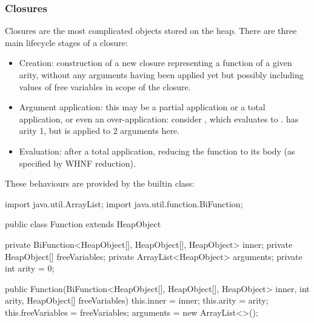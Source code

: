 \documentclass[dissertation.tex]{subfiles}
\begin{document}
{{{        }
        \subsubsection{Closures}\label{sec:closures}
        {

            Closures are the most complicated objects stored on the heap. There are three main lifecycle stages of a
            closure:

            \begin{itemize}
            \item
            {
                Creation: construction of a new closure representing a function of a given arity, without any
                arguments having been applied yet but possibly including values of free variables in scope of the
                closure.
            }
            \item
            {
                
                Argument application: this may be a partial application or a total application, or even an
                over-application: consider , which evaluates to .  has
                arity 1, but is applied to 2 arguments here.

            }
            \item
            {
                Evaluation: after a total application, reducing the function to its body (as specified by WHNF
                reduction).
            }
            \end{itemize}

            These behaviours are provided by the  builtin class:

            \begin{javafigure}
            import java.util.ArrayList;
            import java.util.function.BiFunction;
                            
            public class Function extends HeapObject {
                private BiFunction<HeapObject[], HeapObject[], HeapObject> inner;
                private HeapObject[] freeVariables;
                private ArrayList<HeapObject> arguments;
                private int arity = 0;
                            
                public Function(BiFunction<HeapObject[], HeapObject[], HeapObject> inner,
                                int arity, HeapObject[] freeVariables) {
                    this.inner = inner;
                    this.arity = arity;
                    this.freeVariables = freeVariables;
                    arguments = new ArrayList<>();
                }
                            
}
\end{javafigure}}}}
\end{document}
